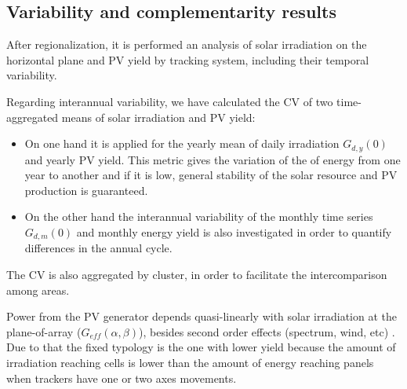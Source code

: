 \subsection{Variability and complementarity results}

After regionalization, it is performed an analysis of solar irradiation on the horizontal plane and PV yield by tracking system, including their temporal variability.

Regarding interannual variability, we have calculated the CV of two time-aggregated means of solar irradiation and PV yield:

\begin{itemize}
\item On one hand it is applied for the yearly mean of daily irradiation $G_{d,y}(0)$ and yearly PV yield. This metric gives the variation of the of energy from one year to another and if it is low, general stability of the solar resource and PV production is guaranteed. 
\item On the other hand the interannual variability of the monthly time series $G_{d,m}(0)$ and monthly energy yield is also investigated in order to quantify differences in the annual cycle. 
\end{itemize}

The CV is also aggregated by cluster, in order to facilitate the intercomparison among areas.


Power from the PV generator depends quasi-linearly with solar irradiation at the plane-of-array ($G_{eff}(\alpha,\beta)$), besides second order effects (spectrum, wind, etc) \cite*{Perpinan2007} . Due to that the fixed typology is the one with lower yield because the amount of irradiation reaching cells is lower than the amount of energy reaching panels when trackers have one or two axes movements.

